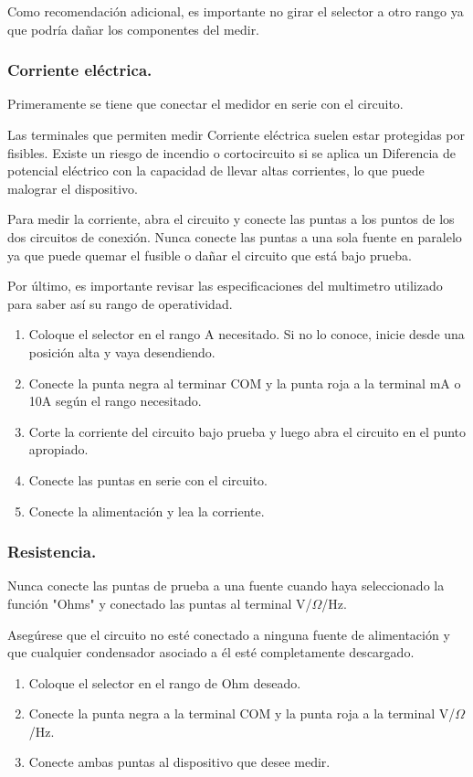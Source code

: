 \documentclass[10pt]{article}
\begin{document}
\begin{multicols}{2}
Como recomendación adicional, es importante no girar el selector a otro rango ya que podría dañar los componentes del medir.
\subsubsection{Corriente eléctrica.}

Primeramente se tiene que conectar el medidor en serie con el circuito.

Las terminales que permiten medir Corriente eléctrica suelen estar protegidas por fisibles. Existe un riesgo de incendio o cortocircuito si se aplica un Diferencia de potencial eléctrico con la capacidad de llevar altas corrientes, lo que puede malograr el dispositivo.

Para medir la corriente, abra el circuito y conecte las puntas a los puntos de los dos circuitos de conexión. Nunca conecte las puntas a una sola fuente en paralelo ya que puede quemar el fusible o dañar el circuito que está bajo prueba.

Por último, es importante revisar las especificaciones del multimetro utilizado para saber así su rango de operatividad.

\begin{enumerate}
	\item Coloque el selector en el rango A necesitado. Si no lo conoce, inicie desde una posición alta y vaya desendiendo.
	\item Conecte la punta negra al terminar COM y la punta roja a la terminal mA o 10A según el rango necesitado.
	\item Corte la corriente del circuito bajo prueba y luego abra el circuito en el punto apropiado.
	\item Conecte las puntas en serie con el circuito. 
	\item Conecte la alimentación y lea la corriente.
\end{enumerate}
\subsubsection{Resistencia.}

Nunca conecte las puntas de prueba a una fuente cuando haya seleccionado la función "Ohms" y conectado las puntas al terminal V/$\Omega$/Hz.

Asegúrese que el circuito no esté conectado a ninguna fuente de alimentación y que cualquier condensador asociado a él esté completamente descargado.

\begin{enumerate}
	\item Coloque el selector en el rango de Ohm deseado.
	\item Conecte la punta negra a la terminal COM y la punta roja a la terminal V/$\Omega$/Hz.
	\item Conecte ambas puntas al dispositivo que desee medir.
\end{enumerate}


\end{multicols}
\end{document}
